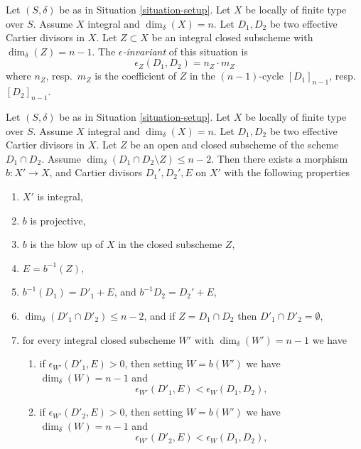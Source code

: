 \begin{definition}
\label{definition-epsilon}
Let $(S, \delta)$ be as in Situation \ref{situation-setup}.
Let $X$ be locally of finite type over $S$.
Assume $X$ integral and $\dim_\delta(X) = n$.
Let $D_1, D_2$ be two effective Cartier divisors in $X$.
Let $Z \subset X$ be an integral closed subscheme
with $\dim_\delta(Z) = n - 1$. The {\it $\epsilon$-invariant}
of this situation is
$$
\epsilon_Z(D_1, D_2) = n_Z \cdot m_Z
$$
where $n_Z$, resp.\ $m_Z$ is the coefficient of
$Z$ in the $(n - 1)$-cycle $[D_1]_{n - 1}$, resp.\ $[D_2]_{n - 1}$.
\end{definition}

\begin{lemma}
\label{lemma-two-divisors}
Let $(S, \delta)$ be as in Situation \ref{situation-setup}.
Let $X$ be locally of finite type over $S$.
Assume $X$ integral and $\dim_\delta(X) = n$.
Let $D_1, D_2$ be two effective Cartier divisors in $X$.
Let $Z$ be an open and closed subscheme of the scheme $D_1 \cap D_2$.
Assume $\dim_\delta(D_1 \cap D_2 \setminus Z) \leq n - 2$.
Then there exists a morphism
$b : X' \to X$, and Cartier divisors
$D_1', D_2', E$ on $X'$ with the following properties
\begin{enumerate}
\item $X'$ is integral,
\item $b$ is projective,
\item $b$ is the blow up of $X$ in the closed subscheme $Z$,
\item $E = b^{-1}(Z)$,
\item $b^{-1}(D_1) = D'_1 + E$, and $b^{-1}D_2 = D_2' + E$,
\item $\dim_\delta(D'_1 \cap D'_2) \leq n - 2$, and if
$Z = D_1 \cap D_2$ then $D'_1 \cap D'_2 = \emptyset$,
\item for every integral closed subscheme $W'$
with $\dim_\delta(W') = n - 1$ we have
\begin{enumerate}
\item if $\epsilon_{W'}(D'_1, E) > 0$, then setting
$W = b(W')$ we have
$\dim_\delta(W) = n - 1$ and
$$
\epsilon_{W'}(D'_1, E) < \epsilon_W(D_1, D_2),
$$
\item if $\epsilon_{W'}(D'_2, E) > 0$, then setting
$W = b(W')$ we have
$\dim_\delta(W) = n - 1$ and
$$
\epsilon_{W'}(D'_2, E) < \epsilon_W(D_1, D_2),
$$
\end{enumerate}
\end{enumerate}
\end{lemma}

